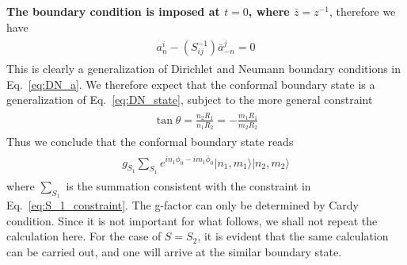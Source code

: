 {\bf\color{red}The boundary condition is imposed at $t=0$, where $\bar{z}=z^{-1}$}, therefore we have
\begin{eqnarray}\begin{aligned}
a^i_n-(S^{-1}_{ij})\bar{a}^j_{-n}=0
\end{aligned}\end{eqnarray}
This is clearly a generalization of Dirichlet and Neumann boundary conditions in Eq.~\eqref{eq:DN_a}. We therefore expect that the conformal boundary state is a generalization of Eq.~\eqref{eq:DN_state}, subject to the more general constraint 
\begin{eqnarray}\begin{aligned}
\label{eq:S_1_constraint}
\tan\theta=\frac{n_2R_1}{n_1R_2}=-\frac{m_1R_1}{m_2R_2}
\end{aligned}\end{eqnarray}
Thus we conclude that the conformal boundary state reads
\begin{eqnarray}\begin{aligned}
g_{S_1}\sum_{S_1}e^{in_1\phi_0-im_1\bar{\phi}_0}|n_1,m_1\rangle|n_2,m_2\rangle
\end{aligned}\end{eqnarray}
where $\sum_{S_1}$ is the summation consistent with the constraint in Eq.~\eqref{eq:S_1_constraint}. The g-factor can only be determined by Cardy condition\cite{oshikawa_boundary_2010}. Since it is not important for what follows, we shall not repeat the calculation here. For the case of $S=S_2$, it is evident that the same calculation can be carried out, and one will arrive at the similar boundary state.

